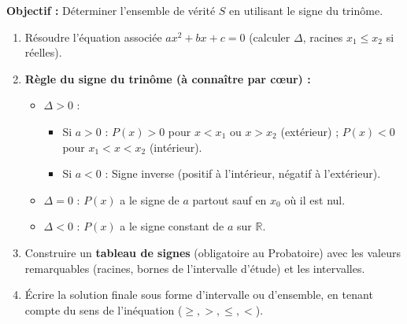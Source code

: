 \documentclass[11pt]{article}
\begin{document}
\begin{methode}
    \textbf{Objectif :} Déterminer l'ensemble de vérité $S$ en utilisant le signe du trinôme.
    \begin{enumerate}
        \item Résoudre l'équation associée $ax^2+bx+c=0$ (calculer $\Delta$, racines $x_1 \le x_2$ si réelles).
        \item \textbf{Règle du signe du trinôme (à connaître par cœur) :}
        \begin{itemize}
            \item $\Delta > 0$ : 
            \begin{itemize}
                \item Si $a > 0$ : $P(x) > 0$ pour $x < x_1$ ou $x > x_2$ (extérieur) ; $P(x) < 0$ pour $x_1 < x < x_2$ (intérieur).
                \item Si $a < 0$ : Signe inverse (positif à l'intérieur, négatif à l'extérieur).
            \end{itemize}
            \item $\Delta = 0$ : $P(x)$ a le signe de $a$ partout sauf en $x_0$ où il est nul.
            \item $\Delta < 0$ : $P(x)$ a le signe constant de $a$ sur $\mathbb{R}$.
        \end{itemize}
        \item Construire un \textbf{tableau de signes} (obligatoire au Probatoire) avec les valeurs remarquables (racines, bornes de l'intervalle d'étude) et les intervalles.
        \item Écrire la solution finale sous forme d'intervalle ou d'ensemble, en tenant compte du sens de l'inéquation ($\ge, >, \le, <$).
    \end{enumerate}
\end{methode}
\end{document}
